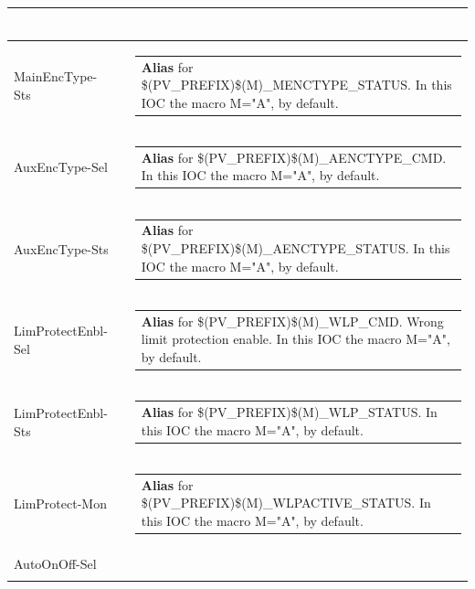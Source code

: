 \documentclass[openany]{article}
\begin{document}
\begin{longtable}{| m{4.5cm} m{2.5cm}  m{8.5cm} |}
\begin{tabular}{@{}m{6cm}@{}}
            \end{tabular} \hypertarget{}{}\\ \hline
        MainEncType-Sts &  & \begin{tabular}{@{}m{6cm}@{}}
                \textbf{\color{blue} Alias} for \$(PV\_PREFIX)\$(M)\_MENCTYPE\_STATUS. In this IOC the macro M="A", by default.
            \end{tabular} \hypertarget{pv:aux-enc-type}{}\\ \hline
        AuxEncType-Sel &  & \begin{tabular}{@{}m{6cm}@{}}
                \textbf{\color{blue} Alias} for \$(PV\_PREFIX)\$(M)\_AENCTYPE\_CMD. In this IOC the macro M="A", by default.
            \end{tabular} \hypertarget{}{}\\ \hline
        AuxEncType-Sts &  & \begin{tabular}{@{}m{6cm}@{}}
                \textbf{\color{blue} Alias} for \$(PV\_PREFIX)\$(M)\_AENCTYPE\_STATUS. In this IOC the macro M="A", by default.
            \end{tabular} \hypertarget{pv:lim-protect-enbl}{}\\ \hline
        LimProtectEnbl-Sel &  & \begin{tabular}{@{}m{6cm}@{}}
                \textbf{\color{blue} Alias} for \$(PV\_PREFIX)\$(M)\_WLP\_CMD. Wrong limit protection enable. In this IOC the macro M="A", by default.
            \end{tabular} \hypertarget{}{}\\ \hline
        LimProtectEnbl-Sts &  & \begin{tabular}{@{}m{6cm}@{}}
                \textbf{\color{blue} Alias} for \$(PV\_PREFIX)\$(M)\_WLP\_STATUS. In this IOC the macro M="A", by default.
            \end{tabular} \hypertarget{pv:lim-protect-mon}{}\\ \hline
        LimProtect-Mon &  & \begin{tabular}{@{}m{6cm}@{}}
                \textbf{\color{blue} Alias} for \$(PV\_PREFIX)\$(M)\_WLPACTIVE\_STATUS. In this IOC the macro M="A", by default.
            \end{tabular} \hypertarget{pv:auto-on-off}{}\\ \hline
        AutoOnOff-Sel &  & \begin{tabular}{@{}m{6cm}@{}}

\end{tabular}
\end{longtable}
\end{document}
